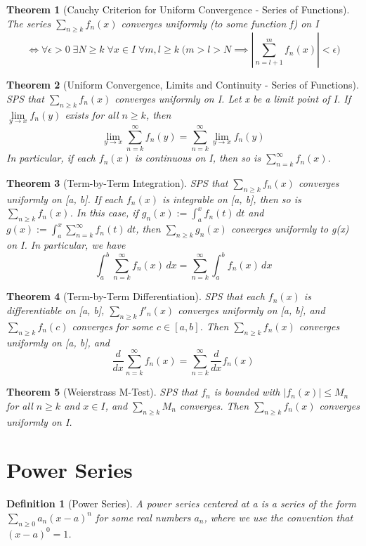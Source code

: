 \documentclass[11pt, oneside]{book}
\theoremstyle{break}
\newtheorem{thm}{Theorem}[section]
\newtheorem{defn}{Definition}[section]
\begin{document}
\begin{thm}[Cauchy Criterion for Uniform Convergence - Series of Functions]
	The series $\sum_{n \geq k} f_n(x)$ converges uniformly (to some function f) on I
	\[
		\iff \forall \epsilon > 0 \; \exists N \geq k \; \forall x \in I \; \forall m, l \geq k \; \Bigg(m > l > N \implies \left|\sum_{n = l + 1}^{m} f_n(x) \right| < \epsilon \Bigg)
	\]
\end{thm}

\begin{thm}[Uniform Convergence, Limits and Continuity - Series of Functions]\label{unif_conv_series_fn}
	SPS that $\sum_{n \geq k} f_n(x)$ converges uniformly on I. Let x be a limit point of I. If $\lim\limits_{y \to x} f_n(y)$ exists for all $n \geq k$, then
	\[
		\lim_{y \to x} \sum_{n = k}^{\infty} f_n(y) = \sum_{n = k}^{\infty} \lim_{y \to x} f_n(y)
	\]
	In particular, if each $f_n(x)$ is continuous on I, then so is $\sum_{n = k}^{\infty} f_n(x)$.
\end{thm}

\begin{thm}[Term-by-Term Integration]
	SPS that $\sum_{n \geq k} f_n(x)$ converges uniformly on [a, b]. If each $f_n(x)$ is integrable on [a, b], then so is $\sum_{n \geq k} f_n(x)$. In this case, if $g_n(x) := \int_{a}^{x} f_n(t) \, dt$ and $g(x) := \int_{a}^{x} \sum_{n = k}^{\infty} f_n(t) \, dt$, then $\sum_{n \geq k} g_n(x)$ converges uniformly to g(x) on I. In particular, we have
	\[
		\int_{a}^{b} \sum_{n = k}^{\infty} f_n(x) \, dx = \sum_{n = k}^{\infty} \int_{a}^{b} f_n(x) \, dx
	\]
\end{thm}

\begin{thm}[Term-by-Term Differentiation]
	SPS that each $f_n(x)$ is differentiable on [a, b], $\sum_{n \geq k} f'_n(x)$ converges uniformly on [a, b], and $\sum_{n \geq k} f_n(c)$ converges for some $c \in [a, b]$. Then $\sum_{n \geq k} f_n(x)$ converges uniformly on [a, b], and
	\[
		\frac{d}{dx} \sum_{n = k}^{\infty} f_n(x) = \sum_{n = k}^{\infty} \frac{d}{dx} f_n(x)
	\]
\end{thm}

\begin{thm}[Weierstrass M-Test]
	SPS that $f_n$ is bounded with $|f_n(x)| \leq M_n$ for all $n \geq k$ and $x \in I$, and $\sum_{n \geq k} M_n$ converges. Then $\sum_{n \geq k} f_n(x)$ converges uniformly on I.
\end{thm}


\section{Power Series}
\begin{defn}[Power Series]
	A power series centered at a is a series of the form $\sum\limits_{n \geq 0} a_n (x - a)^n$ for some real numbers $a_n$, where we use the convention that $(x - a)^0 = 1$.
\end{defn}
\end{document}

